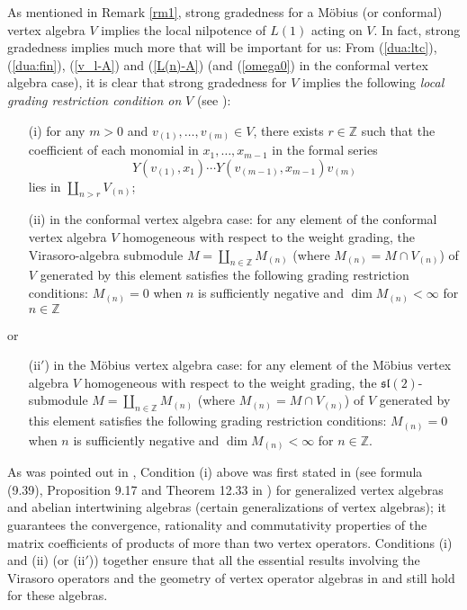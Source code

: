 \documentclass[12pt]{article}
\begin{document}
\begin{rema}{\rm
As mentioned in Remark \ref{rm1}, strong gradedness for a M\"obius (or
conformal) vertex algebra $V$ implies the
local nilpotence of $L(1)$ acting on $V$. In fact,
strong gradedness implies much more that will be important for us:
{}From (\ref{dua:ltc}),
(\ref{dua:fin}), (\ref{v_l-A}) and (\ref{L(n)-A}) (and (\ref{omega0})
in the conformal vertex algebra case), it is clear that strong gradedness
for $V$ implies the following {\em local grading restriction
condition on} $V$ (see \cite{H-codes}):
\begin{enumerate}
\item[(i)] for any $m>0$ and $v_{(1)}, \dots, v_{(m)}\in V$, there
exists $r\in {\mathbb Z}$ such that the coefficient of each monomial in
$x_1, \dots, x_{m-1}$ in the formal series
\[
Y(v_{(1)}, x_1)\cdots Y(v_{(m-1)}, x_{m-1})v_{(m)}
\]
lies in $\coprod_{n>r}V_{(n)}$;
\item[(ii)] in the conformal vertex algebra case: for any element of
the conformal vertex algebra $V$ homogeneous with respect to the
weight grading, the Virasoro-algebra submodule $M=\coprod_{n\in {\mathbb
Z}}M_{(n)}$ (where $M_{(n)}=M\cap V_{(n)}$) of $V$ generated by this
element satisfies the following grading restriction conditions:
$M_{(n)}=0$ when $n$ is sufficiently negative and $\dim
M_{(n)}<\infty$ for $n\in {\mathbb Z}$
\end{enumerate}
or
\begin{enumerate}
\item[(ii$'$)] in the M\"obius vertex algebra case: for any element of
the M\"obius vertex algebra $V$ homogeneous with respect to the weight
grading, the ${\mathfrak s}{\mathfrak l}(2)$-submodule $M=\coprod_{n\in {\mathbb
Z}}M_{(n)}$ (where $M_{(n)}=M\cap V_{(n)}$) of $V$ generated by this
element satisfies the following grading restriction conditions:
$M_{(n)}=0$ when $n$ is sufficiently negative and $\dim
M_{(n)}<\infty$ for $n\in {\mathbb Z}$.
\end{enumerate}
As was pointed out in \cite{H-codes}, Condition (i) above was first stated
in \cite{DL} (see formula (9.39), Proposition 9.17 and Theorem 12.33
in \cite{DL}) for generalized vertex algebras and abelian intertwining
algebras (certain generalizations of vertex algebras); it guarantees
the convergence, rationality and commutativity properties of the
matrix coefficients of products of more than two vertex operators.
Conditions (i) and (ii) (or (ii$'$)) together ensure that all the
essential results involving the Virasoro operators and the geometry of
vertex operator algebras in \cite{H0} and \cite{H1} still hold for these algebras.}
\end{rema}
\end{document}
